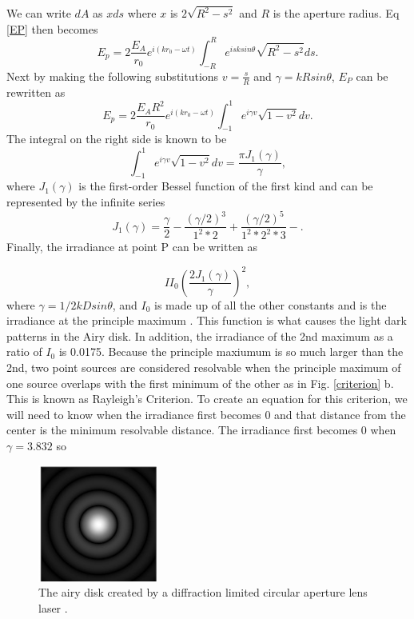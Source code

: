 \documentclass[ notitlepage, numerical, 11pt]{revtex4-1} %
\begin{document}
We can write $dA$ as $xds$ where $x$ is $2\sqrt{R^2 - s^2}$ and $R$ is the aperture radius. Eq \ref{EP} then becomes 
\begin{equation}
E_p = 2\frac{E_A}{r_0}e^{i(k r_0 -\omega t)}\int_{-R}^R e^{i s k sin\theta}\sqrt{R^2 - s^2}ds.
\label{EP2}
\end{equation}
Next by making the following substitutions $v = \frac{s}{R}$ and $\gamma = kRsin\theta$, $E_P$ can be rewritten as
\begin{equation}
E_p = 2\frac{E_A R^2}{r_0}e^{i(k r_0 -\omega t)}\int_{-1}^1 e^{i \gamma v}\sqrt{1 - v^2}dv.
\label{EP3}
\end{equation}
The integral on the right side is known to be
\begin{equation}
\int_{-1}^1 e^{i \gamma v}\sqrt{1 - v^2}dv = \frac{\pi J_1(\gamma)}{\gamma},
\label{bessel}
\end{equation}
where $J_1(\gamma)$ is the first-order Bessel function of the first kind and can be represented by the infinite series \cite{optics}
\begin{equation}
J_1(\gamma) = \frac{\gamma}{2} - \frac{(\gamma /2)^3}{1^2 *2} + \frac{(\gamma /2)^5}{1^2 *2^2 *3} - .
\label{besselSeries}
\end{equation} 
Finally, the irradiance at point P can be written as 

\begin{equation}
I I_0(\frac{2J_1 (\gamma)}{\gamma})^2,
\label{iBessel}
\end{equation} 
where $\gamma = 1/2 k D sin\theta$, and $I_0$ is made up of all the other constants and is the irradiance at the principle maximum \cite{optics}. This function is what causes the light dark patterns in the Airy disk. In addition, the irradiance of the 2nd maximum as a ratio of $I_0$ is 0.0175. Because the principle maxiumum is so much larger than the 2nd, two point sources are considered resolvable when the principle maximum of one source overlaps with the first minimum of the other as in Fig. \ref{criterion} b. This is known as Rayleigh's Criterion. To create an equation for this criterion, we will need to know when the irradiance first becomes 0 and that distance from the center is the minimum resolvable distance. The irradiance first becomes 0 when $\gamma = 3.832$ so \cite{optics}
\begin{figure}[H]
\centerline{\includegraphics[scale=2]{220px-Airy-pattern.jpg}}
\caption{The airy disk created by a diffraction limited circular aperture lens laser \cite{airyDisk}.}
\label{airy}
\end{figure} 
\end{document}
